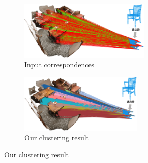 \begin{figure}[ht]
    \centering
    \begin{subfigure}{0.4\textwidth}
        \centering
        \includegraphics[height=2.8cm]{images/scan2cad-cad-input-corrs1.png}
          \caption{Input correspondences}
          \label{fig:scan2cad_cad-input-corrs1}
      \end{subfigure}
      \begin{subfigure}{0.45\textwidth}
        \centering
        \includegraphics[height=2.8cm]{images/scan2cad-cad-cluster-corrs1.png}
          \caption{Our clustering result}
          \label{fig:scan2cad_cad-cluster-corrs1}
      \end{subfigure}



\end{figure}
